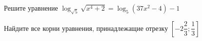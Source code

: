 \begin{ex}
	\begin{condition}
		\begin{enumcols}[label=\asbuk*)]
			\item Решите уравнение \( \log_{\sqrt{5}} \sqrt{x^4 + 2} = \log_5 (37x^2 - 4) - 1 \)
			\item Найдите все корни уравнения, принадлежащие отрезку \( \left[-2\dfrac{2}{3};\dfrac{1}{3}\right] \)
		\end{enumcols}
	\end{condition}
\end{ex}